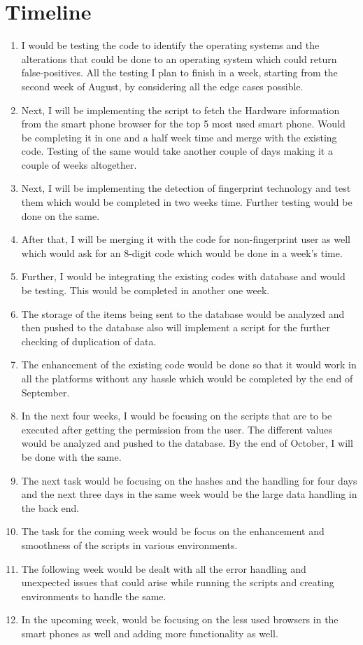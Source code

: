 \documentclass[journal]{IEEEtran}
\begin{document}
\section{Timeline}
\begin{enumerate}
\item I would be testing the code to identify the operating systems and the alterations that could be done to an operating system which could return false-positives. All the testing I plan to finish in a week, starting from the second week of August, by considering all the edge cases possible. 
\item Next, I will be implementing the script to fetch the Hardware information from the smart phone browser for the top 5 most used smart phone. Would be completing it in one and a half week time and merge with the existing code. Testing of the same would take another couple of days making it a couple of weeks altogether. 
\item Next, I will be implementing the detection of fingerprint technology and test them which would be completed in two weeks time. Further testing would be done on the same. 
\item After that, I will be merging it with the code for non-fingerprint user as well which would ask for an 8-digit code which would be done in a week's time. 
\item Further, I would be integrating the existing codes with database and would be testing. This would be completed in another one week. 
\item The storage of the items being sent to the database would be analyzed and then pushed to the database also will implement a script for the further checking of duplication of data. 
\item The enhancement of the existing code would be done so that it would work in all the platforms without any hassle which would be completed by the end of September. 
\item In the next four weeks, I would be focusing on the scripts that are to be executed after getting the permission from the user. The different values would be analyzed and pushed to the database. By the end of October, I will be done with the same. 
\item The next task would be focusing on the hashes and the handling for four days and the next three days in the same week would be the large data handling in the back end. 
\item The task for the coming week would be focus on the enhancement and smoothness of the scripts in various environments. 
\item The following week would be dealt with all the error handling and unexpected issues that could arise while running the scripts and creating environments to handle the same.
\item In the upcoming week, would be focusing on the less used browsers in the smart phones as well and adding more functionality as well.
\end{enumerate}
\end{document}
